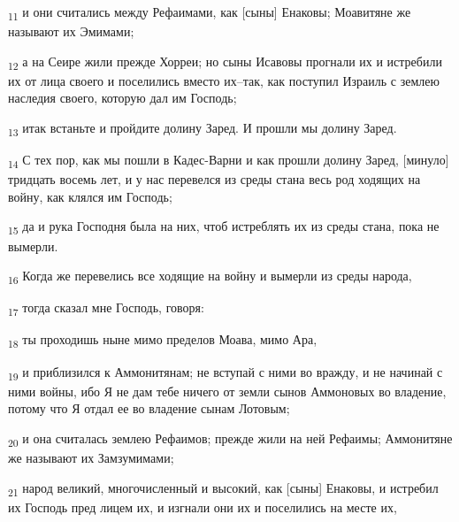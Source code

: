 \begin{tcolorbox}
\textsubscript{11} и они считались между Рефаимами, как [сыны] Енаковы; Моавитяне же называют их Эмимами;
\end{tcolorbox}
\begin{tcolorbox}
\textsubscript{12} а на Сеире жили прежде Хорреи; но сыны Исавовы прогнали их и истребили их от лица своего и поселились вместо их--так, как поступил Израиль с землею наследия своего, которую дал им Господь;
\end{tcolorbox}
\begin{tcolorbox}
\textsubscript{13} итак встаньте и пройдите долину Заред. И прошли мы долину Заред.
\end{tcolorbox}
\begin{tcolorbox}
\textsubscript{14} С тех пор, как мы пошли в Кадес-Варни и как прошли долину Заред, [минуло] тридцать восемь лет, и у нас перевелся из среды стана весь род ходящих на войну, как клялся им Господь;
\end{tcolorbox}
\begin{tcolorbox}
\textsubscript{15} да и рука Господня была на них, чтоб истреблять их из среды стана, пока не вымерли.
\end{tcolorbox}
\begin{tcolorbox}
\textsubscript{16} Когда же перевелись все ходящие на войну и вымерли из среды народа,
\end{tcolorbox}
\begin{tcolorbox}
\textsubscript{17} тогда сказал мне Господь, говоря:
\end{tcolorbox}
\begin{tcolorbox}
\textsubscript{18} ты проходишь ныне мимо пределов Моава, мимо Ара,
\end{tcolorbox}
\begin{tcolorbox}
\textsubscript{19} и приблизился к Аммонитянам; не вступай с ними во вражду, и не начинай с ними войны, ибо Я не дам тебе ничего от земли сынов Аммоновых во владение, потому что Я отдал ее во владение сынам Лотовым;
\end{tcolorbox}
\begin{tcolorbox}
\textsubscript{20} и она считалась землею Рефаимов; прежде жили на ней Рефаимы; Аммонитяне же называют их Замзумимами;
\end{tcolorbox}
\begin{tcolorbox}
\textsubscript{21} народ великий, многочисленный и высокий, как [сыны] Енаковы, и истребил их Господь пред лицем их, и изгнали они их и поселились на месте их,
\end{tcolorbox}
